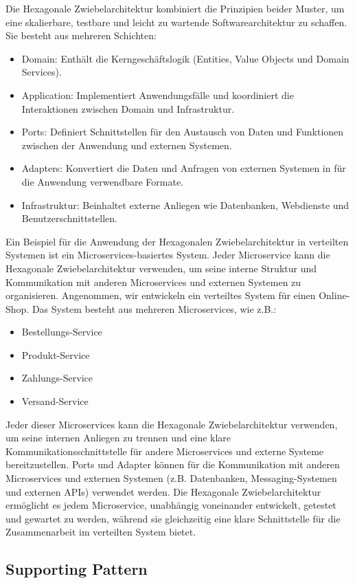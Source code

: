 \documentclass[../vs-script-first-v01.tex]{subfiles}
\begin{document}
Die Hexagonale Zwiebelarchitektur kombiniert die Prinzipien beider Muster, um eine skalierbare, testbare und leicht zu wartende Softwarearchitektur zu schaffen. Sie besteht aus mehreren Schichten:
\begin{itemize}
\item Domain: Enthält die Kerngeschäftslogik (Entities, Value Objects und Domain Services).
\item Application: Implementiert Anwendungsfälle und koordiniert die Interaktionen zwischen Domain und Infrastruktur.
\item Ports: Definiert Schnittstellen für den Austausch von Daten und Funktionen zwischen der Anwendung und externen Systemen.
\item Adapters: Konvertiert die Daten und Anfragen von externen Systemen in für die Anwendung verwendbare Formate.
\item Infrastruktur: Beinhaltet externe Anliegen wie Datenbanken, Webdienste und Benutzerschnittstellen.
\end{itemize}
Ein Beispiel für die Anwendung der Hexagonalen Zwiebelarchitektur in verteilten Systemen ist ein Microservices-basiertes System. Jeder Microservice kann die Hexagonale Zwiebelarchitektur verwenden, um seine interne Struktur und Kommunikation mit anderen Microservices und externen Systemen zu organisieren. Angenommen, wir entwickeln ein verteiltes System für einen Online-Shop. Das System besteht aus mehreren Microservices, wie z.B.:
\begin{itemize}
\item Bestellungs-Service
\item Produkt-Service
\item Zahlungs-Service
\item Versand-Service
\end{itemize}
Jeder dieser Microservices kann die Hexagonale Zwiebelarchitektur verwenden, um seine internen Anliegen zu trennen und eine klare Kommunikationsschnittstelle für andere Microservices und externe Systeme bereitzustellen. Ports und Adapter können für die Kommunikation mit anderen Microservices und externen Systemen (z.B. Datenbanken, Messaging-Systemen und externen APIs) verwendet werden. Die Hexagonale Zwiebelarchitektur ermöglicht es jedem Microservice, unabhängig voneinander entwickelt, getestet und gewartet zu werden, während sie gleichzeitig eine klare Schnittstelle für die Zusammenarbeit im verteilten System bietet.


\label{Woche04}\subsection{Supporting Pattern}
\end{document}
